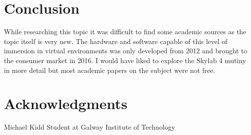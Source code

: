\documentclass[10pt,journal,compsoc]{IEEEtran}
\begin{document}
	
	\section{Conclusion}
	While researching this topic it was difficult to find some academic sources as the topic itself is very new. The hardware and software capable of this level of immersion in virtual environments was only developed from 2012 and brought to the consumer market in 2016. I would have liked to explore the Skylab 4 mutiny in more detail but most academic papers on the subject were not free. 

	\section{Acknowledgments}

	
	\begin{IEEEbiography}{Michael Kidd}
	Student at Galway Institute of Technology
		
	\end{IEEEbiography}
\end{document}
